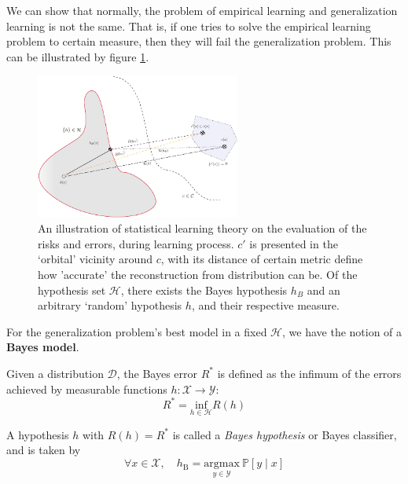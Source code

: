 We can show that normally, the problem of empirical learning and generalization learning is not the same. That is, if one tries to solve the empirical learning problem to certain measure, then they will fail the generalization problem. This can be illustrated by figure \ref{fig:genvsemp_fig}.

\begin{figure}
    \centering
    \includegraphics[width=0.6\textwidth]{pdf/figfig-crop.pdf}
    \caption{An illustration of statistical learning theory on the evaluation of the risks and errors, during learning process. $c'$ is presented in the `orbital' vicinity around $c$, with its distance of certain metric define how 'accurate' the reconstruction from distribution can be. Of the hypothesis set $\mathcal{H}$, there exists the Bayes hypothesis $h_{B}$ and an arbitrary `random' hypothesis $h$, and their respective measure.}
    \label{fig:genvsemp_fig}
\end{figure}

For the generalization problem's best model in a fixed $\mathcal{H}$, we have the notion of a \textbf{Bayes model}. %
\begin{definition}
    Given a distribution $\mathcal{D}$, the Bayes error $R^{*}$ is defined as the infimum of the errors achieved by measurable functions $h:\mathcal{X}\to \mathcal{Y}$: 
    \begin{equation}
        R^{*}=\underset{h\in \mathcal{H}}{\mathrm{inf}}R(h)
    \end{equation}
\end{definition}
\begin{definition}
    A hypothesis $h$ with $R(h)=R^{*}$ is called a \textit{Bayes hypothesis} or Bayes classifier, and is taken by \begin{equation}
        \forall x\in \mathcal{X}, \quad h_{\mathrm{B}}=\underset{y\in \mathcal{Y}}{\mathrm{argmax}}\:\mathbb{P}[y\mid x]
    \end{equation} 
\end{definition}

